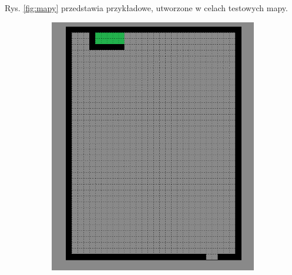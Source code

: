 Rys. \ref{fig:mapy} przedstawia przykładowe, utworzone w celach testowych mapy.
\begin{figure}[H]
    \centering
    \begin{subfigure}[b]{0.3\textwidth}
        \includegraphics[width=\textwidth]{figures/p1.png}
        \caption{}
        \label{fig:gull}
    \end{subfigure}
    ~
    \begin{subfigure}[b]{0.3\textwidth}

\end{subfigure}
\end{figure}
